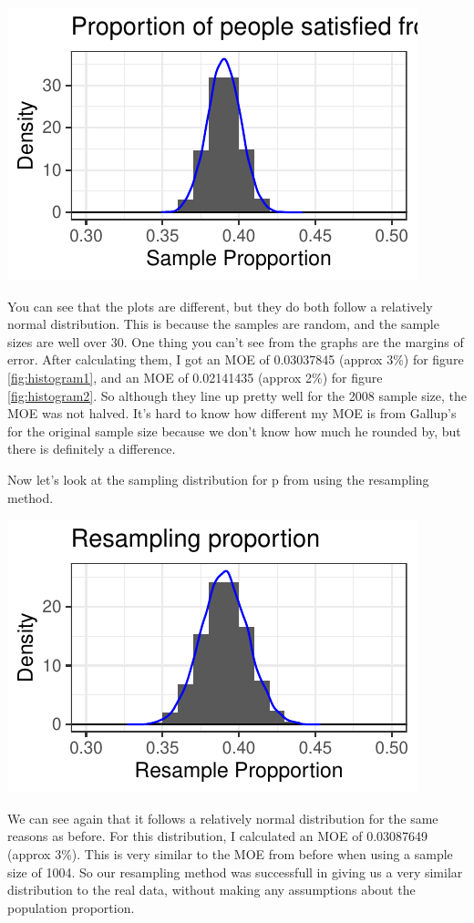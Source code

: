 \documentclass{article}\usepackage[]{graphicx}\usepackage[]{xcolor}
\newenvironment{Figure}
  {\par\medskip\noindent\minipage{\linewidth}}
  {\endminipage\par\medskip}
\begin{document}
\begin{multicols}{2}
\begin{Figure}
\includegraphics{Histogram2.pdf}
\label{fig:histogram2}
\end{Figure}

You can see that the plots are different, but they do both follow a relatively normal distribution. This is because the samples are random, and the sample sizes are well over 30. One thing you can't see from the graphs are the margins of error. After calculating them, I got an MOE of 0.03037845 (approx 3\%) for figure \ref{fig:histogram1}, and an MOE of 0.02141435 (approx 2\%) for figure \ref{fig:histogram2}. So although they line up pretty well for the 2008 sample size, the MOE was not halved. It's hard to know how different my MOE is from Gallup's for the original sample size because we don't know how much he rounded by, but there is definitely a difference.

Now let's look at the sampling distribution for p from using the resampling method. 

\begin{Figure}
\includegraphics{Resampling.pdf}
\label{fig:resampling}
\end{Figure}
We can see again that it follows a relatively normal distribution for the same reasons as before. For this distribution, I calculated an MOE of 0.03087649 (approx 3\%). This is very similar to the MOE from before when using a sample size of 1004. So our resampling method was successfull in giving us a very similar distribution to the real data, without making any assumptions about the population proportion.


\end{multicols}
\end{document}
